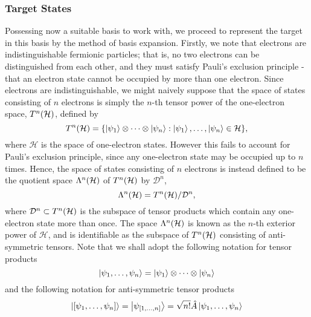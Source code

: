 \documentclass[]{article}
\begin{document}
\subsubsection{Target States}
\label{sec:th-ccc-target}

Possessing now a suitable basis to work with, we proceed to represent the
target in this basis by the method of basis expansion.
Firstly, we note that electrons are indistinguishable fermionic particles; that
is, no two electrons can be distinguished from each other, and they must satisfy
Pauli's exclusion principle - that an electron state cannot be occupied by more
than one electron.
Since electrons are indistinguishable, we might naively suppose that the space
of states consisting of $n$ electrons is simply the $n$-th tensor power of the
one-electron space, $T^{n}(\mathcal{H})$, defined by
\begin{equation}
  \label{eq:tensor-power}
  T^{n}(\mathcal{H})
  =
  \lbrace
    \ket{\psi_{1}}
    \otimes
    \dots
    \otimes
    \ket{\psi_{n}}
    :
    \ket{\psi_{1}},
    \dotsc,
    \ket{\psi_{n}}
    \in \mathcal{H}
  \rbrace
  ,
\end{equation}
where $\mathcal{H}$ is the space of one-electron states.
However this fails to account for Pauli's exclusion principle, since any
one-electron state may be occupied up to $n$ times.
Hence, the space of states consisting of $n$ electrons is instead defined to be
the quotient space $\Lambda^{n}(\mathcal{H})$ of $T^{n}(\mathcal{H})$ by
$\mathcal{D}^{n}$,
\begin{equation}
  \label{eq:exterior-power}
  \Lambda^{n}(\mathcal{H})
  =
  T^{n}(\mathcal{H})
  /
  \mathcal{D}^{n}
  ,
\end{equation}
where $\mathcal{D}^{n} \subset T^{n}(\mathcal{H})$ is the subspace of tensor
products which contain any one-electron state more than once.
The space $\Lambda^{n}(\mathcal{H})$ is known as the $n$-th exterior power of
$\mathcal{H}$, and is identifiable as the subspace of $T^{n}(\mathcal{H})$
consisting of anti-symmetric tensors.
Note that we shall adopt the following notation for tensor products
\begin{equation}
  \label{eq:tensor-product-notation}
  \ket{\psi_{1}, \dotsc, \psi_{n}}
  =
  \ket{\psi_{1}}
  \otimes
  \dots
  \otimes
  \ket{\psi_{n}}
\end{equation}
and the following notation for anti-symmetric tensor products
\begin{equation}
  \label{eq:anti-symmetric-tensor-product-notation}
  \ket{[\psi_{1}, \dotsc, \psi_{n}]}
  =
  \ket{\psi_{[1, \dotsc, n]}}
  =
  \sqrt{n!}
  \hat{A}
  \ket{\psi_{1}, \dotsc, \psi_{n}}
\end{equation}
\end{document}
